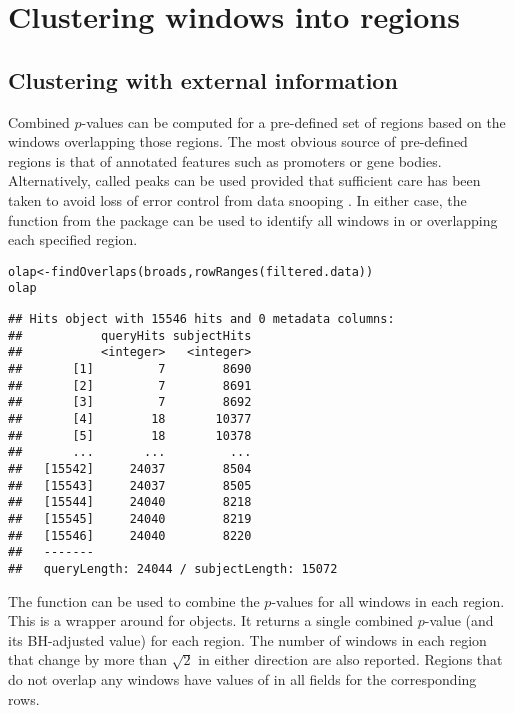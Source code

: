 \documentclass{report}\usepackage[]{graphicx}\usepackage[usenames,dvipsnames]{color}
\newcommand{\hlstd}[1]{\textcolor[rgb]{0.251,0.251,0.251}{#1}}%
\newcommand{\hlkwb}[1]{\textcolor[rgb]{0,0,0}{#1}}%
\newcommand{\hlkwd}[1]{\textcolor[rgb]{0.878,0.439,0.125}{#1}}%
\newenvironment{knitrout}{}{} %
\begin{document}
\section{Clustering windows into regions}

\subsection{Clustering with external information}
Combined $p$-values can be computed for a pre-defined set of regions based on the windows overlapping those regions. 
The most obvious source of pre-defined regions is that of annotated features such as promoters or gene bodies.
Alternatively, called peaks can be used provided that sufficient care has been taken to avoid loss of error control from data snooping \cite{lun2014}.
In either case, the  function from the  package can be used to identify all windows in or overlapping each specified region. 

\begin{knitrout}
\color{fgcolor}\begin{kframe}
\begin{alltt}
\hlstd{olap} \hlkwb{<-} \hlkwd{findOverlaps}\hlstd{(broads,} \hlkwd{rowRanges}\hlstd{(filtered.data))}
\hlstd{olap}
\end{alltt}
\begin{verbatim}
## Hits object with 15546 hits and 0 metadata columns:
##           queryHits subjectHits
##           <integer>   <integer>
##       [1]         7        8690
##       [2]         7        8691
##       [3]         7        8692
##       [4]        18       10377
##       [5]        18       10378
##       ...       ...         ...
##   [15542]     24037        8504
##   [15543]     24037        8505
##   [15544]     24040        8218
##   [15545]     24040        8219
##   [15546]     24040        8220
##   -------
##   queryLength: 24044 / subjectLength: 15072
\end{verbatim}
\end{kframe}
\end{knitrout}

The  function can be used to combine the $p$-values for all windows in each region. 
This is a wrapper around  for  objects.
It returns a single combined $p$-value (and its BH-adjusted value) for each region. 
The number of windows in each region that change by more than $\sqrt{2}$ in either direction are also reported.
Regions that do not overlap any windows have values of  in all fields for the corresponding rows.
\end{document}
